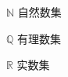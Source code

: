 
\begin{center}
\begin{denotation}[1cm]
  \item[$\mathbb{N}$] 自然数集
  \item[$\mathbb{Q}$] 有理数集
  \item[$\mathbb{R}$] 实数集
\end{denotation}
\end{center}




